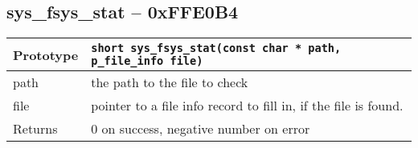 \subsection*{sys\_fsys\_stat -- 0xFFE0B4}
\begin{tabular}{|l||l|} \hline
Prototype & \lstinline!short sys_fsys_stat(const char * path, p_file_info file)! \\ \hline
path & the path to the file to check \\ \hline
file & pointer to a file info record to fill in, if the file is found. \\ \hline
Returns & 0 on success, negative number on error \\ \hline
\end{tabular}
